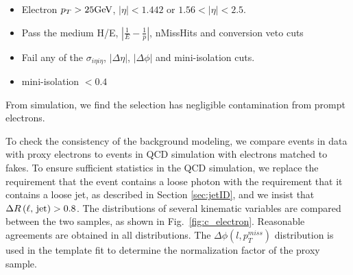 \documentclass[thesis.tex]{subfiles}
\renewcommand\_{\textunderscore\allowbreak}
\begin{document}
\begin{itemize}
    \item Electron $p_T > 25\text{GeV}$, $|\eta| < 1.442$ or $1.56 < |\eta| < 2.5$.
    \item Pass the medium H/E, $|\frac{1}{E}-\frac{1}{p}|$, nMissHits and conversion veto cuts
    \item Fail any of the $\sigma_{i\eta i\eta}$, $|\Delta\eta|$, $|\Delta\phi|$ and mini-isolation cuts. 
		\item mini-isolation $< 0.4$
\end{itemize}
From simulation, we find the selection has negligible contamination from prompt
electrons.

To check the consistency of the background modeling, we compare events in data
with proxy electrons to events in QCD simulation with electrons matched to
fakes. To ensure sufficient statistics in the QCD simulation, we replace the
requirement that the event contains a loose photon with the requirement that it
contains a loose jet, as described in Section \ref{sec:jetID}, and we insist that
$\Delta R\left(\textrm{\ensuremath{\ell}, jet}\right) > 0.8$. The distributions of several
kinematic variables are compared between the two samples, as shown in
Fig.~\ref{fig:c_electron}. Reasonable agreements are obtained in all distributions.
The $\Delta\phi\left(l, p_{T}^{miss}\right)$ distribution
is used in the template fit to determine the normalization factor of the proxy
sample.
\end{document}
